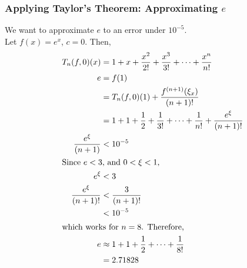 \documentclass[10pt]{extarticle}
\begin{document}
  \subsubsection{Applying Taylor's Theorem: Approximating $e$}%
  We want to approximate $e$ to an error under $10^{-5}$.\\

  Let $f(x) = e^x$, $c = 0$. Then,
  \begin{align*}
    T_n(f,0)(x) &= 1 + x + \frac{x^2}{2!} + \frac{x^3}{3!} + \cdots + \frac{x^n}{n!}\\
    e &= f(1)\\
      &= T_n(f,0)(1) + \frac{f^{(n+1)}(\xi_x)}{(n+1)!}\\
      &= 1 + 1 + \frac{1}{2} + \frac{1}{3!} + \cdots + \frac{1}{n!} + \frac{e^{\xi}}{(n+1)!}\\
    \frac{e^{\xi}}{(n+1)} &< 10^{-5}\\
    \shortintertext{Since $e < 3$, and $0 < \xi < 1$,}
    e^{\xi} &< 3\\
    \frac{e^{\xi}}{(n+1)!} &< \frac{3}{(n+1)!}\\
                           &< 10^{-5}\\
                           \shortintertext{which works for $n = 8$. Therefore,}
    e &\approx 1 + 1 + \frac{1}{2} + \cdots + \frac{1}{8!}\\
      &= 2.71828
  \end{align*}
\end{document}
